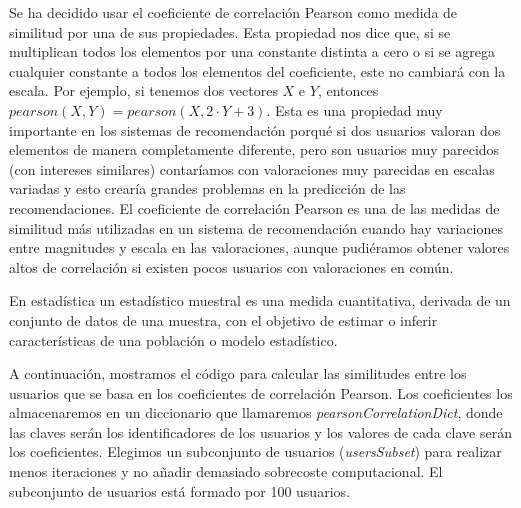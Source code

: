 \documentclass{uimppracticas}
\begin{document}
Se ha decidido usar el coeficiente de correlación Pearson como medida de similitud por una de sus propiedades. Esta propiedad nos dice que, si se multiplican todos los elementos por una constante distinta a cero o si se agrega cualquier constante a todos los elementos del coeficiente, este no cambiará con la escala. Por ejemplo, si tenemos dos vectores $X$ e $Y$, entonces $pearson(X,Y) = pearson(X,2\cdot Y+3)$. Esta es una propiedad muy importante en los sistemas de recomendación porqué si dos usuarios valoran dos elementos de manera completamente diferente, pero son usuarios muy parecidos (con intereses similares) contaríamos con valoraciones muy parecidas en escalas variadas y esto crearía grandes problemas en la predicción de las recomendaciones. El coeficiente de correlación Pearson es una de las medidas de similitud más utilizadas en un sistema de recomendación cuando hay variaciones entre magnitudes y escala en las valoraciones, aunque pudiéramos obtener valores altos de correlación si existen pocos usuarios con valoraciones en común.

\begin{definition}\label{estadístico_muestral}
En estadística un estadístico muestral es una medida cuantitativa, derivada de un conjunto de datos de una muestra, con el objetivo de estimar o inferir características de una población o modelo estadístico.
\end{definition}

A continuación, mostramos el código para calcular las similitudes entre los usuarios que se basa en los coeficientes de correlación Pearson. Los coeficientes los almacenaremos en un diccionario que llamaremos \textit{pearsonCorrelationDict}, donde las claves serán los identificadores de los usuarios y los valores de cada clave serán los coeficientes. Elegimos un subconjunto de usuarios (\textit{usersSubset}) para realizar menos iteraciones y no añadir demasiado sobrecoste computacional. El subconjunto de usuarios está formado por 100 usuarios.
\end{document}
